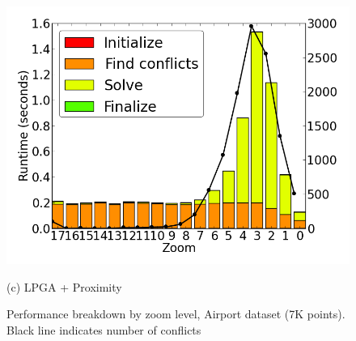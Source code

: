 \begin{figure}[tb]
\begin{minipage}{0.329\linewidth}
    \centerline{\includegraphics[width=1.0\linewidth]{./figs/prelim_pnt_7k_airports_lp_B.png}}
    \centerline{(c) LPGA + Proximity}
  \end{minipage}
  \vspace{-0ex}
  \caption{Performance breakdown by zoom level, Airport dataset (7K points). Black line indicates number of conflicts} \label{fig:performance:airport}
  \vspace{-2ex}
\end{figure}

